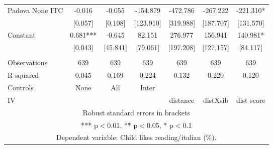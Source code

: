 \begin{tabular}{lcccccc}
Padova None ITC & -0.016 & -0.055 & -154.879 & -472.786 & -267.222 & -221.310* \\
 & [0.057] & [0.108] & [123.910] & [319.988] & [187.707] & [131.570] \\
Constant & 0.681*** & -0.645 & 82.151 & 276.977 & 156.941 & 140.981* \\
 & [0.043] & [45.841] & [79.061] & [197.208] & [127.157] & [84.117] \\
 &  &  &  &  &  &  \\
Observations & 639 & 639 & 639 & 639 & 639 & 639 \\
R-squared & 0.045 & 0.169 & 0.224 & 0.132 & 0.220 & 0.120 \\
Controls & None & All & Inter &  &  &  \\
 IV &  &  &  & distance & distXsib & dist score \\ \hline
\multicolumn{7}{c}{ Robust standard errors in brackets} \\
\multicolumn{7}{c}{ *** p$<$0.01, ** p$<$0.05, * p$<$0.1} \\
\multicolumn{7}{c}{ Dependent variable: Child likes reading/italian (\%).} \\
\end{tabular}

